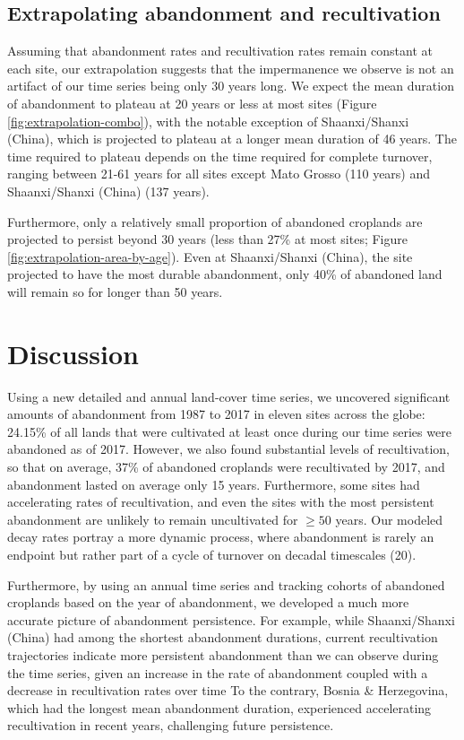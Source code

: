 \documentclass[9pt,twocolumn,twoside,lineno]{pnas-new}
\begin{document}
\hypertarget{extrapolating-abandonment-and-recultivation}{%
\subsection{Extrapolating abandonment and recultivation}\label{extrapolating-abandonment-and-recultivation}}

Assuming that abandonment rates and recultivation rates remain constant at each site, our extrapolation suggests that the impermanence we observe is not an artifact of our time series being only 30 years long.
We expect the mean duration of abandonment to plateau at 20 years or less at most sites (Figure \ref{fig:extrapolation-combo}), with the notable exception of Shaanxi/Shanxi (China), which is projected to plateau at a longer mean duration of 46 years.
The time required to plateau depends on the time required for complete turnover, ranging between 21-61 years for all sites except Mato Grosso (110 years) and Shaanxi/Shanxi (China) (137 years).

Furthermore, only a relatively small proportion of abandoned croplands are projected to persist beyond 30 years (less than 27\% at most sites; Figure \ref{fig:extrapolation-area-by-age}).
Even at Shaanxi/Shanxi (China), the site projected to have the most durable abandonment, only 40\% of abandoned land will remain so for longer than 50 years.

\hypertarget{discussion}{%
\section{Discussion}\label{discussion}}

Using a new detailed and annual land-cover time series, we uncovered significant amounts of abandonment from 1987 to 2017 in eleven sites across the globe: 24.15\% of all lands that were cultivated at least once during our time series were abandoned as of 2017.
However, we also found substantial levels of recultivation, so that on average, 37\% of abandoned croplands were recultivated by 2017, and abandonment lasted on average only 15 years.
Furthermore, some sites had accelerating rates of recultivation, and even the sites with the most persistent abandonment are unlikely to remain uncultivated for \(\geq50\) years.
Our modeled decay rates portray a more dynamic process, where abandonment is rarely an endpoint but rather part of a cycle of turnover on decadal timescales (20).

Furthermore, by using an annual time series and tracking cohorts of abandoned croplands based on the year of abandonment, we developed a much more accurate picture of abandonment persistence.
For example, while Shaanxi/Shanxi (China) had among the shortest abandonment durations, current recultivation trajectories indicate more persistent abandonment than we can observe during the time series, given an increase in the rate of abandonment coupled with a decrease in recultivation rates over time
To the contrary, Bosnia \& Herzegovina, which had the longest mean abandonment duration, experienced accelerating recultivation in recent years, challenging future persistence.
\end{document}
